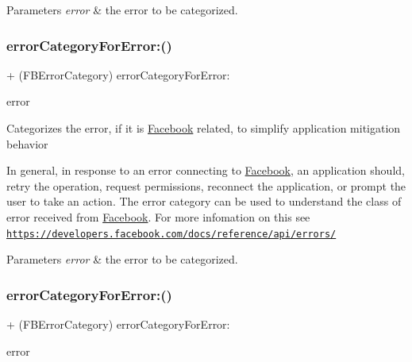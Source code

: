 \begin{DoxyParams}{Parameters}
{\em error} & the error to be categorized. \\
\hline
\end{DoxyParams}
\mbox{\label{interfaceFBErrorUtility_a708ac3cac2c06d5f9432a45e4ad67082}} 
\subsubsection{\texorpdfstring{error\+Category\+For\+Error\+:()}{errorCategoryForError:()}\hspace{0.1cm}{\footnotesize\ttfamily [4/5]}}
{\footnotesize\ttfamily + (F\+B\+Error\+Category) error\+Category\+For\+Error\+: \begin{DoxyParamCaption}\item[{(N\+S\+Error $\ast$)}]{error }\end{DoxyParamCaption}}

Categorizes the error, if it is \hyperlink{interfaceFacebook}{Facebook} related, to simplify application mitigation behavior

In general, in response to an error connecting to \hyperlink{interfaceFacebook}{Facebook}, an application should, retry the operation, request permissions, reconnect the application, or prompt the user to take an action. The error category can be used to understand the class of error received from \hyperlink{interfaceFacebook}{Facebook}. For more infomation on this see \href{https://developers.facebook.com/docs/reference/api/errors/}{\tt https\+://developers.\+facebook.\+com/docs/reference/api/errors/}


\begin{DoxyParams}{Parameters}
{\em error} & the error to be categorized. \\
\hline
\end{DoxyParams}
\mbox{\label{interfaceFBErrorUtility_a708ac3cac2c06d5f9432a45e4ad67082}} 
\subsubsection{\texorpdfstring{error\+Category\+For\+Error\+:()}{errorCategoryForError:()}\hspace{0.1cm}{\footnotesize\ttfamily [5/5]}}
{\footnotesize\ttfamily + (F\+B\+Error\+Category) error\+Category\+For\+Error\+: \begin{DoxyParamCaption}\item[{(N\+S\+Error $\ast$)}]{error }\end{DoxyParamCaption}}

